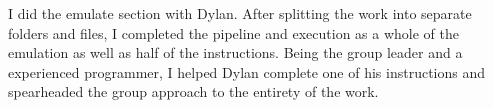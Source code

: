 I did the emulate section with Dylan. After splitting the work into separate folders and files, I completed the pipeline and execution as a whole of the emulation as well as half of the instructions. Being the group leader and a experienced programmer, I helped Dylan complete one of his instructions and spearheaded the group approach to the entirety of the work.